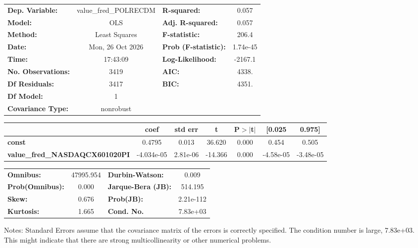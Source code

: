 \begin{center}
\begin{tabular}{lclc}
\toprule
\textbf{Dep. Variable:}                & value\_fred\_POLRECDM & \textbf{  R-squared:         } &     0.057   \\
\textbf{Model:}                        &          OLS          & \textbf{  Adj. R-squared:    } &     0.057   \\
\textbf{Method:}                       &     Least Squares     & \textbf{  F-statistic:       } &     206.4   \\
\textbf{Date:}                         &    Mon, 26 Oct 2026   & \textbf{  Prob (F-statistic):} &  1.74e-45   \\
\textbf{Time:}                         &        17:43:09       & \textbf{  Log-Likelihood:    } &   -2167.1   \\
\textbf{No. Observations:}             &           3419        & \textbf{  AIC:               } &     4338.   \\
\textbf{Df Residuals:}                 &           3417        & \textbf{  BIC:               } &     4351.   \\
\textbf{Df Model:}                     &              1        & \textbf{                     } &             \\
\textbf{Covariance Type:}              &       nonrobust       & \textbf{                     } &             \\
\bottomrule
\end{tabular}
\begin{tabular}{lcccccc}
                                       & \textbf{coef} & \textbf{std err} & \textbf{t} & \textbf{P$> |$t$|$} & \textbf{[0.025} & \textbf{0.975]}  \\
\midrule
\textbf{const}                         &       0.4795  &        0.013     &    36.620  &         0.000        &        0.454    &        0.505     \\
\textbf{value\_fred\_NASDAQCX601020PI} &   -4.034e-05  &     2.81e-06     &   -14.366  &         0.000        &    -4.58e-05    &    -3.48e-05     \\
\bottomrule
\end{tabular}
\begin{tabular}{lclc}
\textbf{Omnibus:}       & 47995.954 & \textbf{  Durbin-Watson:     } &     0.009  \\
\textbf{Prob(Omnibus):} &    0.000  & \textbf{  Jarque-Bera (JB):  } &   514.195  \\
\textbf{Skew:}          &    0.676  & \textbf{  Prob(JB):          } & 2.21e-112  \\
\textbf{Kurtosis:}      &    1.665  & \textbf{  Cond. No.          } &  7.83e+03  \\
\bottomrule
\end{tabular}
\end{center}

Notes: \newline
 [1] Standard Errors assume that the covariance matrix of the errors is correctly specified. \newline
 [2] The condition number is large, 7.83e+03. This might indicate that there are \newline
 strong multicollinearity or other numerical problems.
